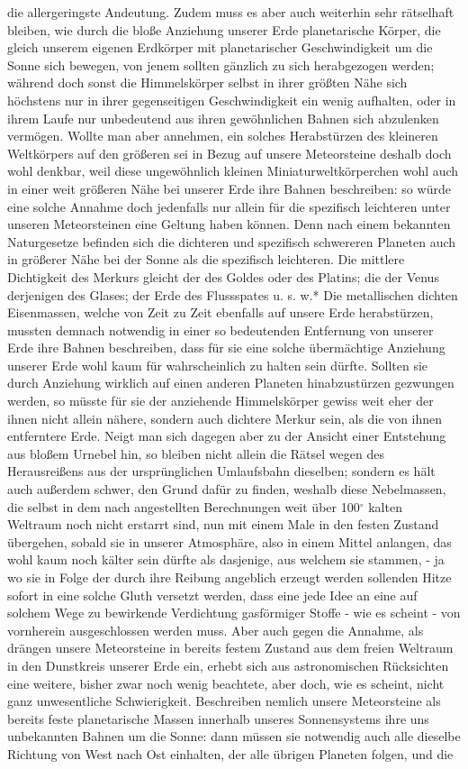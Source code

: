 \documentclass[a4paper, 8pt, oneside, polutonikogreek, german]{article}
\begin{document}
die allergeringste Andeutung. Zudem muss es aber auch weiterhin sehr rätselhaft bleiben, wie durch die bloße Anziehung unserer Erde planetarische Körper, die gleich unserem eigenen Erdkörper mit planetarischer Geschwindigkeit um die Sonne sich bewegen, von jenem sollten gänzlich zu sich herabgezogen werden; während doch sonst die Himmelskörper selbst in ihrer größten Nähe sich höchstens nur in ihrer gegenseitigen Geschwindigkeit ein wenig aufhalten, oder in ihrem Laufe nur unbedeutend aus ihren gewöhnlichen Bahnen sich abzulenken vermögen. Wollte man aber annehmen, ein solches Herabstürzen des kleineren Weltkörpers auf den größeren sei in Bezug auf unsere Meteorsteine deshalb doch wohl denkbar, weil diese ungewöhnlich kleinen Miniaturweltkörperchen wohl auch in einer weit größeren Nähe bei unserer Erde ihre Bahnen beschreiben: so würde eine solche Annahme doch jedenfalls nur allein für die spezifisch leichteren unter unseren Meteorsteinen eine Geltung haben können. Denn nach einem bekannten Naturgesetze befinden sich die dichteren und spezifisch schwereren Planeten auch in größerer Nähe bei der Sonne als die spezifisch leichteren. Die mittlere Dichtigkeit des Merkurs gleicht der des Goldes oder des Platins; die der Venus derjenigen des Glases; der Erde des Flussspates u. s. w.* Die metallischen dichten Eisenmassen, welche von Zeit zu Zeit ebenfalls auf unsere Erde herabstürzen, mussten demnach notwendig in einer so bedeutenden Entfernung von unserer Erde ihre Bahnen beschreiben, dass für sie eine solche übermächtige Anziehung unserer Erde wohl kaum für wahrscheinlich zu halten sein dürfte. Sollten sie durch Anziehung wirklich auf einen anderen Planeten hinabzustürzen gezwungen werden, so müsste für sie der anziehende Himmelskörper gewiss weit eher der ihnen nicht allein nähere, sondern auch dichtere Merkur sein, als die von ihnen entferntere Erde. Neigt man sich dagegen aber zu der Ansicht einer Entstehung aus bloßem Urnebel hin, so bleiben nicht allein die Rätsel wegen des Herausreißens aus der ursprünglichen Umlaufsbahn dieselben; sondern es hält auch außerdem schwer, den Grund dafür zu finden, weshalb diese Nebelmassen, die selbst in dem nach angestellten Berechnungen weit über 100$^\circ$ kalten Weltraum noch nicht erstarrt sind, nun mit einem Male in den festen Zustand übergehen, sobald sie in unserer Atmosphäre, also in einem Mittel anlangen, das wohl kaum noch kälter sein dürfte als dasjenige, aus welchem sie stammen, - ja wo sie in Folge der durch ihre Reibung angeblich erzeugt werden sollenden Hitze sofort in eine solche Gluth versetzt werden, dass eine jede Idee an eine auf solchem Wege zu bewirkende Verdichtung gasförmiger Stoffe - wie es scheint - von vornherein ausgeschlossen werden muss. Aber auch gegen die Annahme, als drängen unsere Meteorsteine in bereits festem Zustand aus dem freien Weltraum in den Dunstkreis unserer Erde ein, erhebt sich aus astronomischen Rücksichten eine weitere, bisher zwar noch wenig beachtete, aber doch, wie es scheint, nicht ganz unwesentliche Schwierigkeit. Beschreiben nemlich unsere Meteorsteine als bereits feste planetarische Massen innerhalb unseres Sonnensystems ihre uns unbekannten Bahnen um die Sonne: dann müssen sie notwendig auch alle dieselbe Richtung von West nach Ost einhalten, der alle übrigen Planeten folgen, und die 
\end{document}
